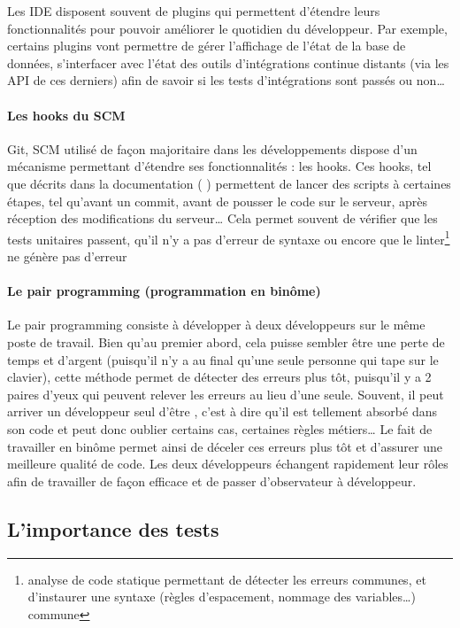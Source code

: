 Les \gls{IDE} disposent souvent de plugins qui permettent d'étendre leurs fonctionnalités pour pouvoir améliorer le quotidien du développeur. Par exemple, certains plugins vont permettre de gérer l'affichage de l'état de la base de données, s'interfacer avec l'état des outils d'intégrations continue distants (via les \gls{API} de ces derniers) afin de savoir si les tests d'intégrations sont passés ou non\ldots

\paragraph{Les hooks du \gls{SCM}} Git, \gls{SCM} utilisé de façon majoritaire dans les développements dispose d'un mécanisme permettant d'étendre ses fonctionnalités : les hooks. Ces hooks, tel que décrits dans la documentation ( \cite[chapitre 8.3]{git-hook}) permettent de lancer des scripts à certaines étapes, tel qu'avant un commit, avant de pousser le code sur le serveur, après réception des modifications du serveur\ldots{} Cela permet souvent de vérifier que les tests unitaires passent, qu'il n'y a pas d'erreur de syntaxe ou encore que le linter\footnote{analyse de code statique permettant de détecter les erreurs communes, et d'instaurer une syntaxe (règles d'espacement, nommage des variables\ldots) commune} ne génère pas d'erreur

\paragraph{Le pair programming (programmation en binôme)}

Le pair programming consiste à développer à deux développeurs sur le même poste de travail. Bien qu'au premier abord, cela puisse sembler être une perte de temps et d'argent (puisqu'il n'y a au final qu'une seule personne qui tape sur le clavier), cette méthode permet de détecter des erreurs plus tôt, puisqu'il y a 2 paires d'yeux qui peuvent relever les erreurs au lieu d'une seule. Souvent, il peut arriver un développeur seul d'être , c'est à dire qu'il est tellement absorbé dans son code et peut donc oublier certains cas, certaines règles métiers\ldots{} Le fait de travailler en binôme permet ainsi de déceler ces erreurs plus tôt et d'assurer une meilleure qualité de code. Les deux développeurs échangent rapidement leur rôles afin de travailler de façon efficace et de passer d'observateur à développeur. 

\subsection{L'importance des tests} \label{importance-test}

